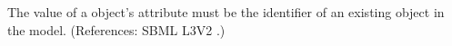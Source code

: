 The value of a \SpeciesReference object's  attribute must be
the identifier of an existing \Species object in the model.  (References:
SBML L3V2 .)
